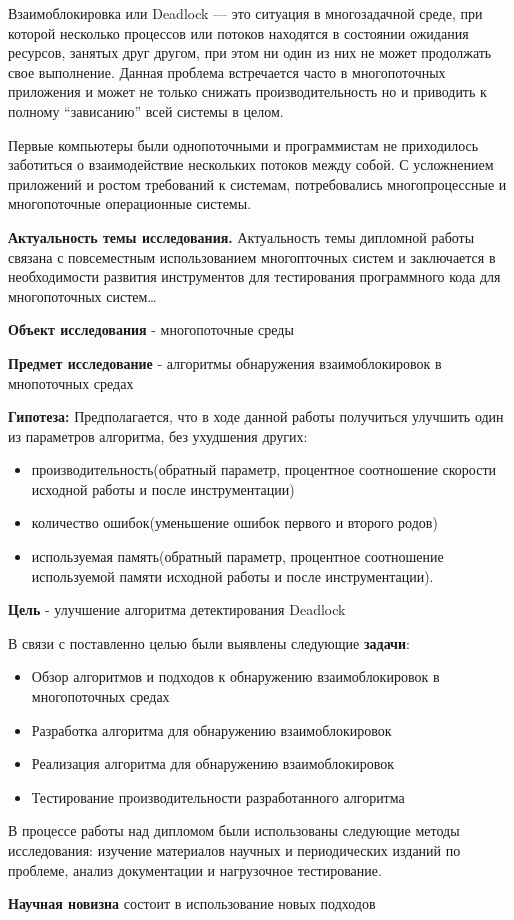 
Взаимоблокировка или Deadlock \cite{Deadlock} — это ситуация в многозадачной среде, при которой несколько процессов или потоков находятся в состоянии ожидания ресурсов, занятых друг другом, при этом ни один из них не может продолжать свое выполнение. Данная проблема встречается часто в многопоточных приложения и может не только снижать производительность но и приводить к полному “зависанию” всей системы в целом.

Первые компьютеры были однопоточными и программистам не приходилось заботиться о взаимодействие нескольких потоков между собой. С усложнением приложений и ростом требований к системам, потребовались многопроцессные и многопоточные операционные системы.

\textbf{Актуальность темы исследования.} Актуальность темы дипломной работы связана с повсеместным использованием многопточных систем и заключается в необходимости развития инструментов для тестирования программного кода для многопоточных систем\dots

\textbf{Объект исследования} - многопоточные среды

\textbf{Предмет исследование} - алгоритмы обнаружения взаимоблокировок в мнопоточных средах

\textbf{Гипотеза:} Предполагается, что в ходе данной работы получиться улучшить один из параметров алгоритма, без ухудшения других:
\begin{itemize} 
\item  производительность(обратный параметр, процентное соотношение скорости исходной работы и после инструментации)
\item количество ошибок(уменьшение ошибок первого и второго родов)
\item используемая память(обратный параметр, процентное соотношение используемой памяти исходной работы и после инструментации).
\end{itemize} 

\textbf{Цель} - улучшение алгоритма детектирования Deadlock

В связи с поставленно целью были выявлены следующие \textbf{задачи}:

\begin{itemize}  
\item Обзор алгоритмов и подходов к обнаружению взаимоблокировок в многопоточных средах
\item Разработка алгоритма для обнаружению взаимоблокировок
\item Реализация алгоритма для обнаружению взаимоблокировок
\item Тестирование производительности разработанного алгоритма
\end{itemize}

В процессе работы над дипломом были использованы следующие методы исследования: изучение материалов научных и периодических изданий по проблеме, анализ документации и нагрузочное тестирование.

\textbf{Научная новизна} состоит в использование новых подходов 

\clearpage